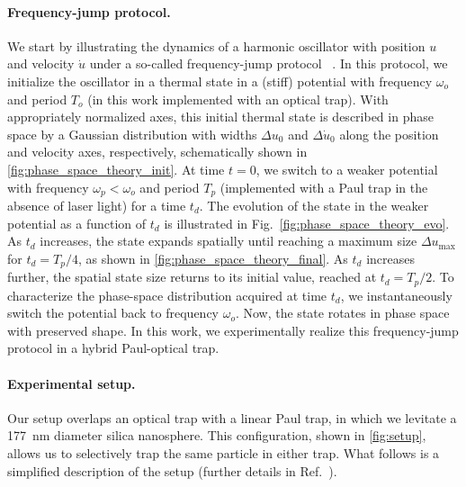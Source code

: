\paragraph*{Frequency-jump protocol.}
We start by illustrating the dynamics of a harmonic oscillator with position $u$ and velocity $\dot{u}$ under a so-called frequency-jump protocol~ \cite{janszky1986squeezing, graham1987squeezing, lo1990squeezing, cosco2021enhanced, Xin2021}.
In this protocol, we initialize the oscillator in a thermal state 
in a (stiff) potential with frequency $\omega_o$ and period $T_o$ (in this work implemented with an optical trap).
With appropriately normalized axes, this initial thermal state is described in phase space by a Gaussian distribution with widths $\Delta u_0$ and $\Delta\dot u_0$ along the position and velocity axes, respectively, schematically shown in \cref{fig:phase_space_theory_init}.
At time $t=0$, we switch to a weaker potential with frequency $\omega_p<\omega_o$ and period $T_p$ (implemented with a Paul trap in the absence of laser light) for a time $t_d$.
The evolution of the state in the weaker potential as a function of $t_d$ is illustrated in Fig.~\ref{fig:phase_space_theory_evo}. 
As $t_d$ increases, the state expands spatially until reaching a maximum size $\Delta u_\text{max}$ for $t_d=T_p/4$, as shown in \cref{fig:phase_space_theory_final}. As $t_d$ increases further, the spatial state size returns to its initial value, reached at  $t_d=T_p/2$.
To characterize the phase-space distribution acquired at time $t_d$, we instantaneously switch the potential back to frequency $\omega_o$. Now, the state rotates in phase space with preserved shape. In this work, we experimentally realize this frequency-jump protocol in a hybrid Paul-optical trap.


\paragraph*{Experimental setup.}
Our setup overlaps an optical trap with a linear Paul trap, in which we levitate a \SI{177}{\nano\meter} diameter silica nanosphere. This configuration, shown in \cref{fig:setup}, allows us to selectively trap the same particle in either trap. What follows is a simplified description of the setup  (further details  in Ref.~\cite{Bonvin2023}).


